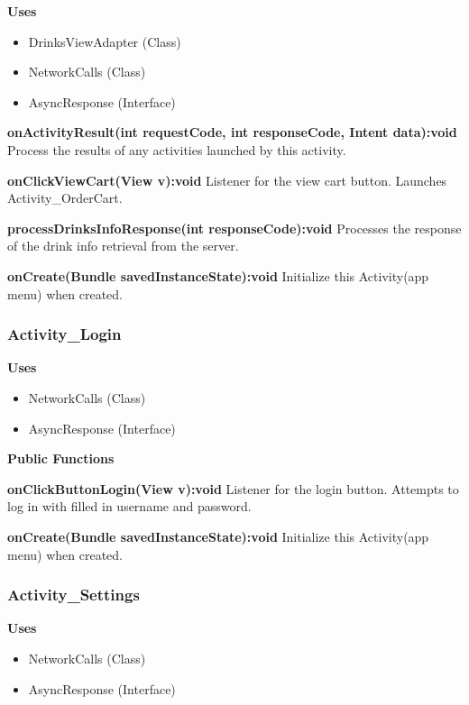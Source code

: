 \documentclass [10pt]{article}
\begin{document}
\textbf{Uses}

\begin{itemize}
	\item DrinksViewAdapter (Class)
	\item NetworkCalls (Class)
	\item AsyncResponse (Interface)
\end{itemize}

\textbf{onActivityResult(int requestCode, int responseCode, Intent data):void}
Process the results of any activities launched by this activity.

\textbf{onClickViewCart(View v):void}
Listener for the view cart button. Launches Activity\_OrderCart.

\textbf{processDrinksInfoResponse(int responseCode):void}
Processes the response of the drink info retrieval from the server.

\textbf{onCreate(Bundle savedInstanceState):void}
Initialize this Activity(app menu) when created.


\subsubsection{Activity\_Login}

\textbf{Uses}
\begin{itemize}
	\item NetworkCalls (Class)
	\item AsyncResponse (Interface)
\end{itemize}

\textbf{Public Functions}

\textbf{onClickButtonLogin(View v):void}
Listener for the login button. Attempts to log in with filled in username and password.

\textbf{onCreate(Bundle savedInstanceState):void}
Initialize this Activity(app menu) when created.


\subsubsection{Activity\_Settings}

\textbf{Uses}
\begin{itemize}
	\item NetworkCalls (Class)
	\item AsyncResponse (Interface)
\end{itemize}
\end{document}
